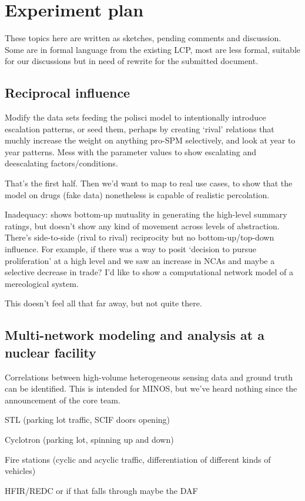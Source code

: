 \documentclass{article} %
\begin{document}
\pagebreak
\section{Experiment plan}

These topics here are written as sketches, pending comments and discussion. Some are in formal language from the existing LCP, most are less formal, suitable for our discussions but in need of rewrite for the submitted document.

\subsection{Reciprocal influence}
Modify the data sets feeding the polisci model to intentionally introduce escalation patterns, or seed them, perhaps by creating `rival' relations that muchly increase the weight on anything pro-SPM selectively, and look at year to year patterns. Mess with the parameter values to show escalating and deescalating factors/conditions.

That's the first half. Then we'd want to map to real use cases, to show that the model on drugs (fake data) nonetheless is capable of realistic percolation. 

Inadequacy: shows bottom-up mutuality in generating the high-level summary ratings, but doesn't show any kind of movement across levels of abstraction. There's side-to-side (rival to rival) reciprocity but no bottom-up/top-down influence. For example, if there was a way to posit `decision to pursue proliferation' at a high level and we saw an increase in NCAs and maybe a selective decrease in trade? I'd like to show a computational network model of a mereological system.

{\color {red} This doesn't feel all that far away, but not quite there.}

\subsection{Multi-network modeling and analysis at a nuclear facility}
Correlations between high-volume heterogeneous sensing data and ground truth can be identified. This is intended for MINOS, but we've heard nothing since the announcement of the core team.

\begin{enumerate*}
\item STL (parking lot traffic, SCIF doors opening)
\item Cyclotron (parking lot, spinning up and down)
\item Fire stations (cyclic and acyclic traffic, differentiation of different kinds of vehicles)
\item HFIR/REDC or if that falls through maybe the DAF
\end{enumerate*}
\end{document}
